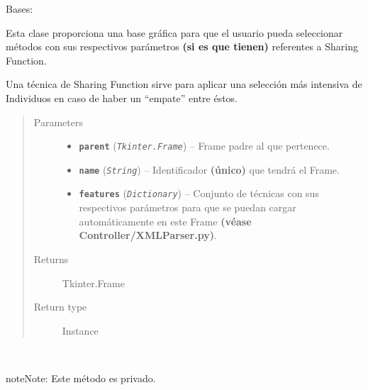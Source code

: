 \documentclass[letterpaper,10pt,english]{sphinxmanual}
\begin{document}
\begin{fulllineitems}
\label{View/Main/MOEA/SharingFunctionFrame:View.Main.MOEA.SharingFunctionFrame.SharingFunctionFrame}
Bases: 

\begin{DUlineblock}{0em}
\item[] Esta clase proporciona una base gráfica para que el usuario pueda
seleccionar métodos con sus respectivos parámetros \textbf{(si es que tienen)}
referentes a Sharing Function.          
\item[] Una técnica de Sharing Function sirve para aplicar una selección más intensiva
de Individuos en caso de haber un ``empate'' entre éstos.
\end{DUlineblock}
\begin{quote}\begin{description}
\item[{Parameters}] \leavevmode\begin{itemize}
\item {} 
\textbf{\texttt{parent}} (\emph{\texttt{Tkinter.Frame}}) -- Frame padre al que pertenece.

\item {} 
\textbf{\texttt{name}} (\emph{\texttt{String}}) -- Identificador \textbf{(único)} que tendrá el Frame.

\item {} 
\textbf{\texttt{features}} (\emph{\texttt{Dictionary}}) -- Conjunto de técnicas con sus respectivos parámetros para que
se puedan cargar automáticamente en este Frame \textbf{(véase
Controller/XMLParser.py)}.

\end{itemize}

\item[{Returns}] \leavevmode
Tkinter.Frame

\item[{Return type}] \leavevmode
Instance

\end{description}\end{quote}

\begin{fulllineitems}
\label{View/Main/MOEA/SharingFunctionFrame:View.Main.MOEA.SharingFunctionFrame.SharingFunctionFrame._SharingFunctionFrame__create_dynamic_widgets}~
\begin{notice}{note}{Note:}
Este método es privado.
\end{notice}


\end{fulllineitems}
\end{fulllineitems}
\end{document}
